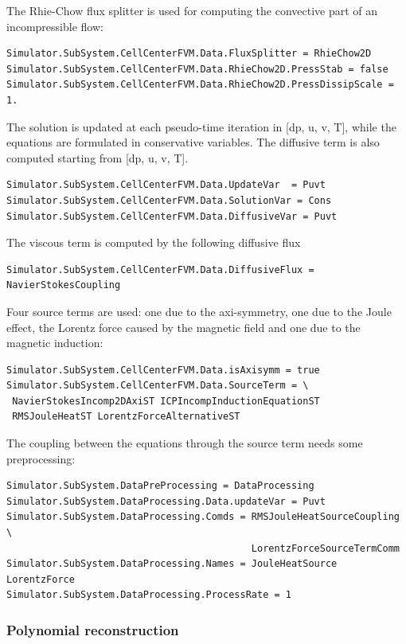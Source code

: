 \documentclass[11pt]{article}
\begin{document}
The Rhie-Chow flux splitter is used for computing the convective part of an
incompressible flow:
\begin{verbatim}
Simulator.SubSystem.CellCenterFVM.Data.FluxSplitter = RhieChow2D
Simulator.SubSystem.CellCenterFVM.Data.RhieChow2D.PressStab = false
Simulator.SubSystem.CellCenterFVM.Data.RhieChow2D.PressDissipScale = 1.
\end{verbatim}

The solution is updated at each pseudo-time iteration in [dp, u, v, T], while the equations are formulated 
in conservative variables. The diffusive term is also computed starting from [dp, u, v, T].
\begin{verbatim}
Simulator.SubSystem.CellCenterFVM.Data.UpdateVar  = Puvt
Simulator.SubSystem.CellCenterFVM.Data.SolutionVar = Cons 
Simulator.SubSystem.CellCenterFVM.Data.DiffusiveVar = Puvt
\end{verbatim}

The viscous term is computed by the following diffusive flux
\begin{verbatim}
Simulator.SubSystem.CellCenterFVM.Data.DiffusiveFlux = NavierStokesCoupling
\end{verbatim}
Four source terms are used: one due to the axi-symmetry, one due to the Joule effect, the Lorentz force
caused by the magnetic field and one due to the magnetic induction:
\begin{verbatim}
Simulator.SubSystem.CellCenterFVM.Data.isAxisymm = true
Simulator.SubSystem.CellCenterFVM.Data.SourceTerm = \
 NavierStokesIncomp2DAxiST ICPIncompInductionEquationST
 RMSJouleHeatST LorentzForceAlternativeST
\end{verbatim}

The coupling between the equations through the source term needs some preprocessing:
\begin{verbatim}
Simulator.SubSystem.DataPreProcessing = DataProcessing
Simulator.SubSystem.DataProcessing.Data.updateVar = Puvt
Simulator.SubSystem.DataProcessing.Comds = RMSJouleHeatSourceCoupling \
                                           LorentzForceSourceTermComm
Simulator.SubSystem.DataProcessing.Names = JouleHeatSource LorentzForce
Simulator.SubSystem.DataProcessing.ProcessRate = 1
\end{verbatim}

\subsubsection{Polynomial reconstruction}
\end{document}
